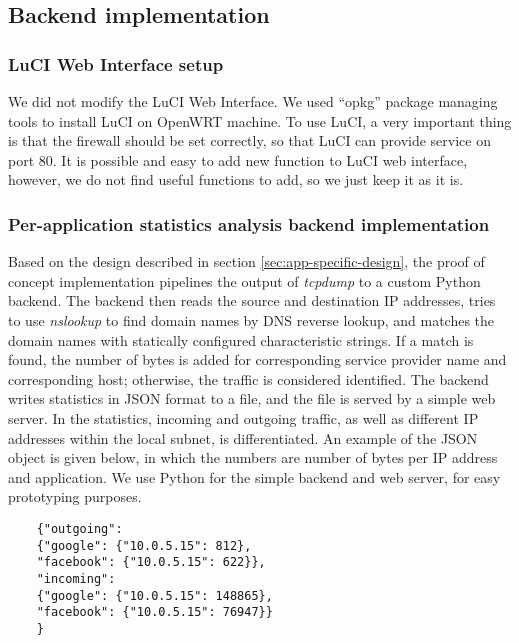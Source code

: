 \subsection{Backend implementation}

\subsubsection{LuCI Web Interface setup}
We did not modify the LuCI Web Interface. We used ``opkg'' package managing tools to install LuCI on OpenWRT machine. To use LuCI, a very important thing is that the firewall should be set correctly, so that LuCI can provide service on port 80. It is possible and easy to add new function to LuCI web interface, however, we do not find useful functions to add, so we just keep it as it is.

\subsubsection{Per-application statistics analysis backend implementation}

Based on the design described in section \ref{sec:app-specific-design}, the proof of concept implementation pipelines the output of \textit{tcpdump} to a custom Python backend. The backend then reads the source and destination IP addresses, tries to use \textit{nslookup} to find domain names by DNS reverse lookup, and matches the domain names with statically configured characteristic strings. If a match is found, the number of bytes is added for corresponding service provider name and corresponding host; otherwise, the traffic is considered identified. The backend writes statistics in JSON format to a file, and the file is served by a simple web server. In the statistics, incoming and outgoing traffic, as well as different IP addresses within the local subnet, is differentiated. An example of the JSON object is given below, in which the numbers are number of bytes per IP address and application. We use Python for the simple backend and web server, for easy prototyping purposes.

\begin{listing}
	\begin{verbatim}
	{"outgoing": 
	{"google": {"10.0.5.15": 812}, 
	"facebook": {"10.0.5.15": 622}}, 
	"incoming": 
	{"google": {"10.0.5.15": 148865}, 
	"facebook": {"10.0.5.15": 76947}}
	}
	\end{verbatim}
\end{listing}

